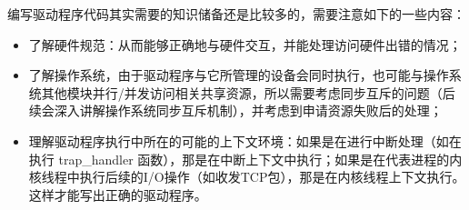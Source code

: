 编写驱动程序代码其实需要的知识储备还是比较多的，需要注意如下的一些内容：
	
\begin{itemize}
	\item 了解硬件规范：从而能够正确地与硬件交互，并能处理访问硬件出错的情况；
	\item 了解操作系统，由于驱动程序与它所管理的设备会同时执行，也可能与操作系统其他模块并行/并发访问相关共享资源，所以需要考虑同步互斥的问题（后续会深入讲解操作系统同步互斥机制），并考虑到申请资源失败后的处理；
	\item 理解驱动程序执行中所在的可能的上下文环境：如果是在进行中断处理（如在执行 trap\_handler 函数），那是在中断上下文中执行；如果是在代表进程的内核线程中执行后续的I/O操作（如收发TCP包），那是在内核线程上下文执行。这样才能写出正确的驱动程序。
\end{itemize}

